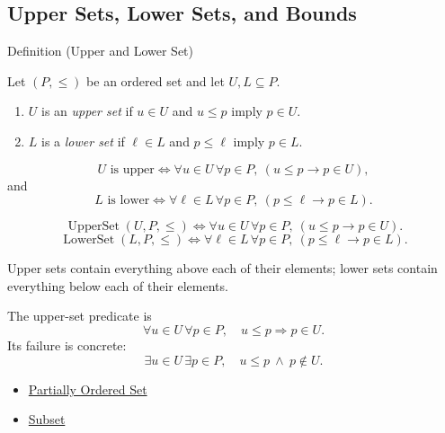 
\subsection*{Upper Sets, Lower Sets, and Bounds}

\begin{definitionbox}{Definition (Upper and Lower Set)}
\begin{definition}\label{def:upper-lower-set}
Let $(P,\leq)$ be an ordered set and let $U,L\subseteq P$.
\begin{enumerate}[label=(\roman*)]
\item $U$ is an \emph{upper set} if $u\in U$ and $u\leq p$ imply $p\in U$.
\item $L$ is a \emph{lower set} if $\ell\in L$ and $p\leq \ell$ imply
$p\in L$.
\end{enumerate}
\end{definition}
\end{definitionbox}

\begin{remark*}
\[
  U\text{ is upper}
  \iff
  \forall u\in U\,\forall p\in P,\ (u\leq p\to p\in U),
\]
and
\[
  L\text{ is lower}
  \iff
  \forall \ell\in L\,\forall p\in P,\ (p\leq \ell\to p\in L).
\]
\end{remark*}

\begin{remark*}
\[
  \operatorname{UpperSet}(U,P,\leq)
  \iff
  \forall u\in U\,\forall p\in P,\ (u\leq p\to p\in U).
\]
\[
  \operatorname{LowerSet}(L,P,\leq)
  \iff
  \forall \ell\in L\,\forall p\in P,\ (p\leq \ell\to p\in L).
\]
\end{remark*}

\begin{remark*}[Interpretation]
Upper sets contain everything above each of their elements; lower sets contain
everything below each of their elements.
\end{remark*}

\begin{remark*}[Exposition]
The upper-set predicate is
\[
\forall u\in U\,\forall p\in P,\quad u\leq p\Rightarrow p\in U.
\]
Its failure is concrete:
\[
\exists u\in U\,\exists p\in P,\quad u\leq p\ \land\ p\notin U.
\]
\end{remark*}

\begin{dependencies}
\begin{itemize}
  \item \hyperref[def:partially-ordered-set]{Partially Ordered Set}
  \item \hyperref[def:subset]{Subset}
\end{itemize}
\end{dependencies}

